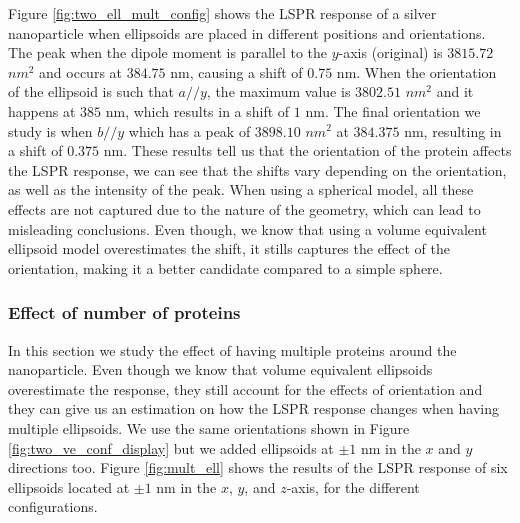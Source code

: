 Figure \ref{fig:two_ell_mult_config} shows the LSPR response of a silver nanoparticle when ellipsoids 
are placed in different positions and orientations. The peak when the dipole moment is parallel to the $y$-axis (original)
is $3815.72$ $nm^2$ and occurs at $384.75$ nm, causing a shift of $0.75$ nm. When the orientation of the ellipsoid 
is such that $a//y$, the maximum value is $3802.51$ $nm^2$ and it happens at $385$ nm, which results in a shift of 
$1$ nm. The final orientation we study is when $b//y$ which has a peak of $3898.10$ $nm^2$ at $384.375$ nm, resulting 
in a shift of $0.375$ nm. These results tell us that the orientation of the protein affects the LSPR response, we can 
see that the shifts vary depending on the orientation, as well as the intensity of the peak. When using a spherical model, 
all these effects are not captured due to the nature of the geometry, which can lead to misleading conclusions. Even though, 
we know that using a volume equivalent ellipsoid model overestimates the shift, it stills captures the effect of the orientation, making
it a better candidate compared to a simple sphere.

\subsubsection{Effect of number of proteins}

In this section we study the effect of having multiple proteins around the nanoparticle. Even though we know 
that volume equivalent ellipsoids overestimate the response, they still account for the effects of 
orientation and they can give us an estimation on how the LSPR response changes when having multiple 
ellipsoids. We use the same orientations shown in Figure \ref{fig:two_ve_conf_display} but we added ellipsoids 
at $\pm 1$ nm in the $x$ and $y$ directions too. Figure \ref{fig:mult_ell} shows the results of the LSPR response 
of six ellipsoids located at $\pm 1$ nm in the $x$, $y$, and $z$-axis, for the different configurations. 
 
